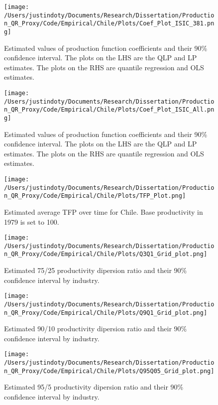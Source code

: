 \documentclass[11pt]{article}
\begin{document}
\begin{figure}[H]
\centering
\texttt{[image: /Users/justindoty/Documents/Research/Dissertation/Production\_QR\_Proxy/Code/Empirical/Chile/Plots/Coef\_Plot\_ISIC\_381.png]}
\caption{Estimated values of production function coefficients and their 90\% confidence interval. The plots on the LHS are the QLP and LP estimates. The plots on the RHS are quantile regression and OLS estimates.}
\end{figure}

\begin{figure}[H]
\centering
\texttt{[image: /Users/justindoty/Documents/Research/Dissertation/Production\_QR\_Proxy/Code/Empirical/Chile/Plots/Coef\_Plot\_ISIC\_All.png]}
\caption{Estimated values of production function coefficients and their 90\% confidence interval. The plots on the LHS are the QLP and LP estimates. The plots on the RHS are quantile regression and OLS estimates.}
\end{figure}

\begin{figure}[H]
\centering
\texttt{[image: /Users/justindoty/Documents/Research/Dissertation/Production\_QR\_Proxy/Code/Empirical/Chile/Plots/TFP\_Plot.png]}
\caption{Estimated average TFP over time for Chile. Base productivity in 1979 is set to 100.}
\end{figure}

\begin{figure}[H]
\centering
\texttt{[image: /Users/justindoty/Documents/Research/Dissertation/Production\_QR\_Proxy/Code/Empirical/Chile/Plots/Q3Q1\_Grid\_plot.png]}
\caption{Estimated 75/25 productivity dipersion ratio and their 90\% confidence interval by industry.}
\end{figure}

\begin{figure}[H]
\centering
\texttt{[image: /Users/justindoty/Documents/Research/Dissertation/Production\_QR\_Proxy/Code/Empirical/Chile/Plots/Q9Q1\_Grid\_plot.png]}
\caption{Estimated 90/10 productivity dipersion ratio and their 90\% confidence interval by industry.}
\end{figure}

\begin{figure}[H]
\centering
\texttt{[image: /Users/justindoty/Documents/Research/Dissertation/Production\_QR\_Proxy/Code/Empirical/Chile/Plots/Q95Q05\_Grid\_plot.png]}
\caption{Estimated 95/5 productivity dipersion ratio and their 90\% confidence interval by industry.}
\end{figure}
\end{document}
